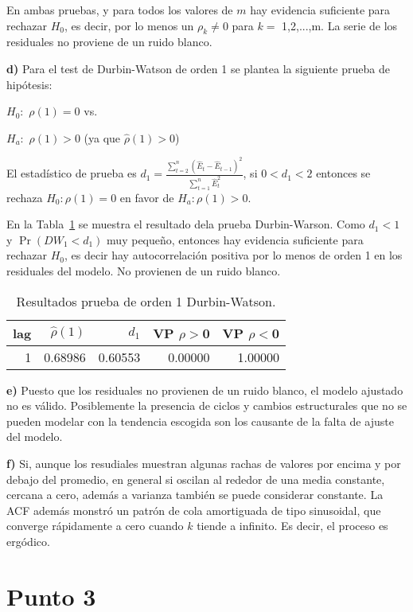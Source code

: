 \documentclass{tufte-handout}
\begin{document}
En ambas pruebas, y para todos los valores de $m$ hay evidencia suficiente para rechazar $H_0$, es decir, por lo menos un $\rho_k \neq 0$ para $k=$ 1,2,...,m. La serie de los residuales no proviene de un ruido blanco.

\textbf{d)} Para el test de Durbin-Watson de orden 1 se plantea la siguiente prueba de hipótesis: 

$H_0:$ $\rho(1)=0$ vs.

$H_a:$ $\rho(1)>0$ (ya que $\hat{\rho}(1)>0$)

El estadístico de prueba es $d_1 = \frac{\sum_{t=2}^n (\hat{E}_t - \hat{E}_{t-1})^2}{\sum_{t=1}^n \hat{E}_t^2}$, si $0<d_1<2$ entonces se rechaza $H_0: \rho(1)=0$ en favor de $H_a: \rho(1)>0$.

En la Tabla~\ref{tab:p2_db} se muestra el resultado dela prueba Durbin-Warson. Como $d_1 < 1$ y $\Pr(DW_1 < d_1)$ muy pequeño, entonces hay evidencia suficiente para rechazar $H_0$, es decir hay autocorrelación positiva por lo menos de orden 1 en los residuales del modelo. No provienen de un ruido blanco.

\begin{table}[ht]
\centering
\begin{tabular}{rrrrr}
  \hline
lag & $\hat{\rho}(1)$ & $d_1$ & VP $\rho>$0 & VP $\rho<$0 \\ 
  \hline
1 & 0.68986 & 0.60553 & 0.00000 & 1.00000 \\ 
   \hline
\end{tabular}
\caption{Resultados prueba de orden 1 Durbin-Watson.} 
\label{tab:p2_db}
\end{table}


\textbf{e)} Puesto que los residuales no provienen de un ruido blanco, el modelo ajustado no es válido. Posiblemente la presencia de ciclos y cambios estructurales que no se  pueden modelar con la tendencia escogida son los causante de la falta de ajuste del modelo.

\textbf{f)} Si, aunque los resudiales muestran algunas rachas de valores por encima y por debajo del promedio, en general si oscilan al rededor de una media constante, cercana a cero, además a varianza también se puede considerar constante. La ACF además monstró un patrón de cola amortiguada de tipo sinusoidal, que converge rápidamente a cero cuando $k$ tiende a infinito. Es decir, el proceso es ergódico.


\section*{Punto 3}
\end{document}
